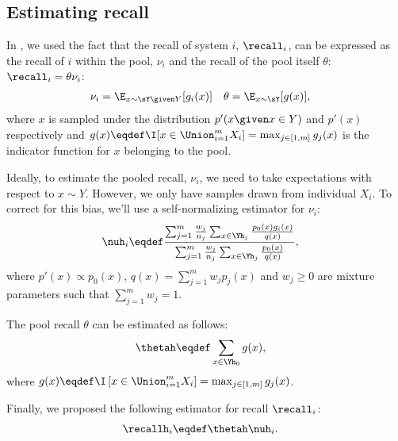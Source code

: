 \subsection{Estimating recall}

In , we used the fact that the recall of system $i$, $\recall_i$, can be expressed as the recall of $i$ within the pool, $\nu_i$ and the recall of the pool itself $\theta$: $\recall_i = \theta \nu_i$:  
\begin{align*}
  \nu_i &= \E_{x \sim \sY \given Y}[g_i(x)] &
  \theta &= \E_{x \sim \sY}[g(x)],
\end{align*}
where $x$ is sampled under the distribution $p'(x \given x \in Y)$ and $p'(x)$ respectively and
  $g(x) \eqdef \I[x \in \Union_{i=1}^m X_i] = \max_{j \in [1,m]} g_j(x)$ is the indicator function for $x$ belonging to the pool.

Ideally, to estimate the pooled recall, $\nu_i$, we need to take expectations with respect to $x \sim Y$.
However, we only have samples drawn from individual $X_i$.
To correct for this bias, we'll use a self-normalizing estimator for $\nu_i$:
\begin{align*}
  \nuh_i &\eqdef \frac{\sum_{j=1}^m \frac{w_j}{n_j} \sum_{x \in \Yh_j} \frac{p_0(x) g_i(x)}{q(x)}}{\sum_{j=1}^m \frac{w_j}{n_j} \sum_{x \in \Yh_j} \frac{p_0(x)}{q(x)}},
\end{align*}
where $p'(x) \propto p_0(x)$, $q(x) = \sum_{j=1}^m w_{j} p_j(x)$ and $w_{j} \ge 0$ are mixture parameters such that $\sum_{j=1}^m w_{j} = 1$.

The pool recall $\theta$ can be estimated as follows:
\begin{align*}
  \thetah &\eqdef \sum_{x \in \Yh_0} g(x),
\end{align*}
where $g(x) \eqdef \I\left[ x \in \Union_{i=1}^m X_i \right] = \max_{j \in [1,m]} g_j(x)$.

Finally, we proposed the following estimator for recall $\recall_i$:
\begin{align*}
  \recallh_i &\eqdef \thetah\nuh_i.
\end{align*}

